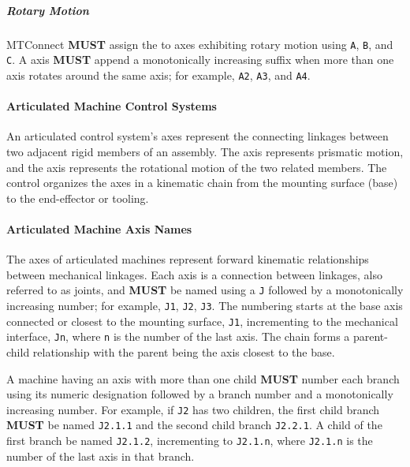 \subparagraph{Rotary Motion}\mbox{}
\label{sec:Rotary Motion}

\gls{MTConnect} \textbf{MUST} assign the  to  axes exhibiting rotary motion using \texttt{A}, \texttt{B}, and \texttt{C}. A  axis  \textbf{MUST} append a monotonically increasing suffix when more than one  axis rotates around the same  axis; for example, \texttt{A2}, \texttt{A3}, and \texttt{A4}. 

\paragraph{Articulated Machine Control Systems}\mbox{}
\label{sec:Articulated Machine Control Systems}

An articulated control system's axes represent the connecting linkages between two adjacent rigid members of an assembly. The  axis represents prismatic motion, and the  axis represents the rotational motion of the two related members. The control organizes the axes in a kinematic chain from the mounting surface (base) to the end-effector or tooling.

\paragraph{Articulated Machine Axis Names}\mbox{}
\label{sec:Articulated Machine Axis Names}

The axes of articulated machines represent forward kinematic relationships between mechanical linkages. Each axis is a connection between linkages, also referred to as joints, and \textbf{MUST} be named using a \texttt{J} followed by a monotonically increasing number; for example, \texttt{J1}, \texttt{J2}, \texttt{J3}.  The numbering starts at the base axis connected or closest to the mounting surface, \texttt{J1}, incrementing to the mechanical interface, \texttt{Jn}, where \texttt{n} is the number of the last axis. The chain forms a parent-child relationship with the parent being the axis closest to the base.

A machine having an axis with more than one child \textbf{MUST} number each branch using its numeric designation followed by a branch number and a monotonically increasing number. For example, if \texttt{J2} has two children, the first child branch \textbf{MUST} be named \texttt{J2.1.1} and the second child branch \texttt{J2.2.1}. A child of the first branch \MUST be named \texttt{J2.1.2}, incrementing to \texttt{J2.1.n}, where \texttt{J2.1.n} is the number of the last axis in that branch.


